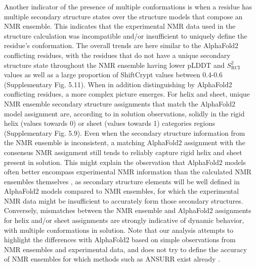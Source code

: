 Another indicator of the presence of multiple conformations is when a residue has multiple secondary structure states over the structure models that compose an NMR ensemble. This indicates that the experimental NMR data used in the structure calculation was incompatible and/or insufficient to uniquely define the residue's conformation. The overall trends are here similar to the AlphaFold2 conflicting residues, with the residues that do not have a unique secondary structure state throughout the NMR ensemble having lower pLDDT and $S^{2}_{\text{RCI}}$ values as well as a large proportion of ShiftCrypt values between 0.4-0.6 (Supplementary Fig. 5.11).
When in addition distinguishing by AlphaFold2 conflicting residues, a more complex picture emerges. For helix and sheet, unique NMR ensemble secondary structure assignments that match the AlphaFold2 model assignment are, according to in solution observations, solidly in the rigid helix (values towards 0) or sheet (values towards 1) categories regions (Supplementary Fig. 5.9).
Even when the secondary structure information from the NMR ensemble is inconsistent, a matching AlphaFold2 assignment with the consensus NMR assignment still tends to reliably capture rigid helix and sheet present in solution. This might explain the observation that AlphaFold2 models often better encompass experimental NMR information than the calculated NMR ensembles themselves \cite{li_blind_2023}, as secondary structure elements will be well defined in AlphaFold2 models compared to NMR ensembles, for which the experimental NMR data might be insufficient to accurately form those secondary structures. Conversely, mismatches between the NMR ensemble and AlphaFold2 assignments for helix and/or sheet assignments are strongly indicative of dynamic behavior, with multiple conformations in solution. Note that our analysis attempts to highlight the differences with AlphaFold2 based on simple observations from NMR ensembles and experimental data, and does not try to define the accuracy of NMR ensembles for which methods such as ANSURR exist already \cite{fowler2020method}.


